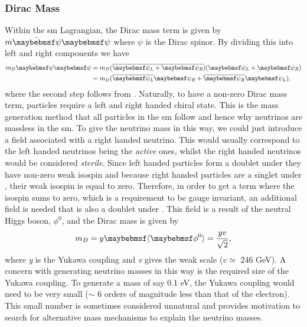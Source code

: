 \subsubsection{Dirac Mass}
Within the \gls{sm} Lagrangian, the Dirac mass term is given by $m\Bar{\psi}\psi$ where $\psi$ is the Dirac spinor. By dividing this into left and right components we have 
\begin{equation}\label{eqn:Dirac mass term}
\begin{split}
    m_D\Bar{\psi}\psi &= m_D(\overline{\psi_L + \psi_R})(\psi_L + \psi_R) \\
    &= m_D(\overline{\psi_L}\psi_R + \overline{\psi_R}\psi_L),
\end{split}
\end{equation} 
where the second step follows from . Naturally, to have a non-zero Dirac mass term, particles require a left and right handed chiral state. This is the mass generation method that all particles in the \gls{sm} follow and hence why neutrinos are massless in the \gls{sm}. To give the neutrino mass in this way, we could just introduce a field associated with a right handed neutrino. This would usually correspond to the left handed neutrinos being the \textit{active} ones, whilst the right handed neutrinos would be considered \textit{sterile}. Since left handed particles form a doublet under  they have non-zero weak isospin and because right handed particles are a singlet under , their weak isospin is equal to zero. Therefore, in order to get a term where the isospin sums to zero, which is a requirement to be gauge invariant, an additional field is needed that is also a doublet under . This field is a result of the neutral Higgs boson, $\phi^0$, and the Dirac mass is given by
\begin{equation}
    m_D = y\braket{\phi^0} = \frac{yv}{\sqrt{2}},
\end{equation}
where \textit{y} is the Yukawa coupling and \textit{v} gives the weak scale ($v \simeq$ 246 GeV). A concern with generating neutrino masses in this way is the required size of the Yukawa coupling. To generate a mass of say 0.1 eV, the Yukawa coupling would need to be very small ($\sim$ 6 orders of magnitude less than that of the electron). This small number is sometimes considered unnatural and provides motivation to search for alternative mass mechanisms to explain the neutrino masses.

\cite{White_Paper}

